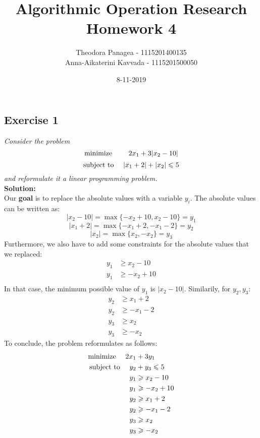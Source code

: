 \documentclass[12pt]{article}
\title{Algorithmic Operation Research \\ Homework 4}
\date{8-11-2019}
\author{Theodora Panagea - 1115201400135 \\ Anna-Aikaterini Kavvada - 1115201500050}
\begin{document}
	\maketitle{}
  	

\subsection*{Exercise 1}
\textit{Consider the problem 
$$\text{minimize \qquad} 2x_1 + 3 \vert x_2 - 10 \vert$$
$$\text{subject to \quad} \vert x_1 + 2 \vert + \vert x_2 \vert \leqslant 5 $$
and reformulate it a linear programming problem. 
}
\\
\textbf{Solution:} \\
Our \textbf{goal} is to replace the absolute values with a variable $y_i$. The absolute values can be written as: \\
$$  \vert x_2 - 10 \vert = \max{\lbrace-x_2+10, x_2-10\rbrace} = y_1$$ 
$$ \vert x_1 + 2 \vert  = \max{\lbrace-x_1 + 2, - x_1 - 2 \rbrace} = y_2$$
$$\vert x_2 \vert = \max{\lbrace x_2, -x_2 \rbrace} = y_3$$ 
Furthermore, we also have to add some constraints for the absolute values that we replaced:
\begin{align*}
y_1 &\geqslant x_2 - 10  \\
y_1 &\geqslant -x_2 + 10 \\
\end{align*}
In that case, the minimum possible value of $y_1$ is $ \vert x_2 - 10 \vert$. Similarily, for $y_2, y_3$: \\
\begin{align*}
y_2 &\geqslant x_1 + 2 \\
y_2 &\geqslant -x_1 - 2 \\
y_3 &\geqslant x_2 \\
y_3 &\geqslant -x_2
\end{align*}
To conclude, the problem reformulates as follows: 
\begin{align*}
\text{minimize \quad} 2x_1 &+ 3y_1 \\
\text{subject to \quad} y_2 &+ y_3 \leqslant 5 \\
y_1 &\geqslant x_2 - 10  \\
y_1 &\geqslant -x_2 + 10 \\
y_2 &\geqslant x_1 + 2 \\
y_2 &\geqslant -x_1 - 2 \\
y_3 &\geqslant x_2 \\
y_3 &\geqslant -x_2
\end{align*}
\newpage
\end{document}
